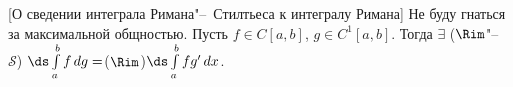 [О сведении интеграла Римана"--~Стилтьеса к интегралу Римана]
	Не буду гнаться за максимальной общностью. Пусть $f\in C[a,b]$, $g\in C^1[a,b]$. Тогда $\exists$ ($\Rim$"--~$\mathcal S$)
	$\ds\int\limits_a^bf\,dg=$($\Rim$)$\ds\int\limits_a^bfg'\,dx$.
	